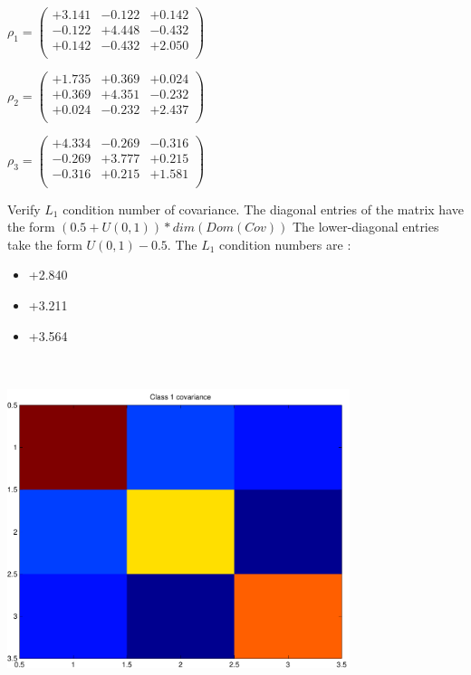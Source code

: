 \documentclass[9pt]{article}
\theoremstyle{plain}
\theoremstyle{definition}
\theoremstyle{remark}
\numberwithin{equation}{section}
\begin{document}
$\rho_1 = \left(
\begin{array}{
ccc}
+3.141 & -0.122 & +0.142 \\
-0.122 & +4.448 & -0.432 \\
+0.142 & -0.432 & +2.050 \\
\end{array}
\right)$ \newline 

$\rho_2 = \left(
\begin{array}{
ccc}
+1.735 & +0.369 & +0.024 \\
+0.369 & +4.351 & -0.232 \\
+0.024 & -0.232 & +2.437 \\
\end{array}
\right)$ \newline 

$\rho_3 = \left(
\begin{array}{
ccc}
+4.334 & -0.269 & -0.316 \\
-0.269 & +3.777 & +0.215 \\
-0.316 & +0.215 & +1.581 \\
\end{array}
\right)$ \newline 

Verify $L_1$ condition number of covariance. The diagonal entries of the matrix have the form $(0.5 + U(0,1) )*dim(Dom(Cov))$
The lower-diagonal entries take the form $U(0,1) - 0.5$. 
The $L_1$ condition numbers are :
\begin{itemize}
\item +2.840
\item +3.211
\item +3.564
\end{itemize}
\includegraphics[width=10.0cm,height=10.0cm]{rv1_corr.pdf}
\end{document}
